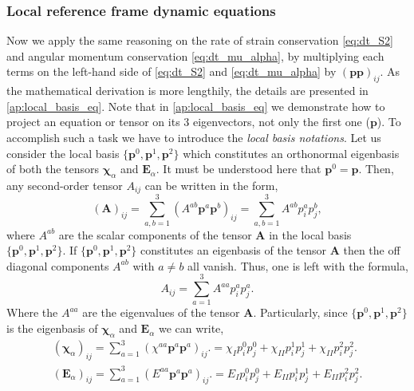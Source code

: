 \subsubsection{Local reference frame dynamic equations}

Now we apply the same reasoning on the rate of strain conservation \eqref{eq:dt_S2} and angular momentum conservation \eqref{eq:dt_mu_alpha},
by multiplying each terms on the left-hand side of \ref{eq:dt_S2} and \ref{eq:dt_mu_alpha} by $(\textbf{pp})_{ij}$. 
As the mathematical derivation is more lengthily, the details are presented in \ref{ap:local_basis_eq}. 
Note that in \ref{ap:local_basis_eq} we demonstrate how to project an equation or tensor on its $3$ eigenvectors, not only the first one ($\textbf{p}$). 
To accomplish such a task we have to introduce the \textit{local basis notations}. 
Let us consider the local basis $\{\textbf{p}^0, \textbf{p}^1, \textbf{p}^2\}$ which constitutes an orthonormal eigenbasis of both the tensors $\bm\chi_\alpha$ and $\textbf{E}_\alpha$. 
It must be understood here that $\textbf{p}^0 = \textbf{p}$. 
Then, any second-order tensor $A_{ij}$ can be written in the form, 
\begin{equation*}
    (\textbf{A})_{ij}
    = 
    \sum_{a,b =1}^3
    (A^{ab} \textbf{p}^a\textbf{p}^b)_{ij}
    = 
    \sum_{a,b =1}^3
    A^{ab} p_i^ap_j^b,
\end{equation*}
where $A^{ab}$ are the scalar components of the tensor \textbf{A} in the local basis  $\{\textbf{p}^0, \textbf{p}^1, \textbf{p}^2\}$. 
If $\{\textbf{p}^0, \textbf{p}^1, \textbf{p}^2\}$ constitutes an eigenbasis of the tensor \textbf{A} then the off diagonal components $A^{ab}$ with $a\neq b$ all vanish. 
Thus, one is left with the formula, 
\begin{equation*}
    A_{ij}
    = 
    \sum_{a =1}^3
    A^{aa} p_i^ap_j^a. 
\end{equation*}
Where the $A^{aa}$ are the eigenvalues of the tensor \textbf{A}. 
Particularly, since $\{\textbf{p}^0, \textbf{p}^1, \textbf{p}^2\}$ is the eigenbasis of $\bm\chi_\alpha$ and $\textbf{E}_\alpha$ we can write, 
\begin{align*}
    (\bm\chi_\alpha)_{ij}
    =
    \sum_{a =1}^3
    (\chi^{aa} \textbf{p}^a\textbf{p}^a)_{ij}. 
    =
    \chi_I  p_i^0p_j^0
    + \chi_{II}  p_i^1p_j^1
    + \chi_{II}  p_i^2p_j^2. \\
    (\textbf{E}_\alpha)_{ij}
    =
    \sum_{a =1}^3
    (E^{aa} \textbf{p}^a\textbf{p}^a)_{ij}. 
    = 
    E_I  p_i^0p_j^0
    + E_{II}  p_i^1p_j^1
    + E_{II}  p_i^2p_j^2. \\
\end{align*}


